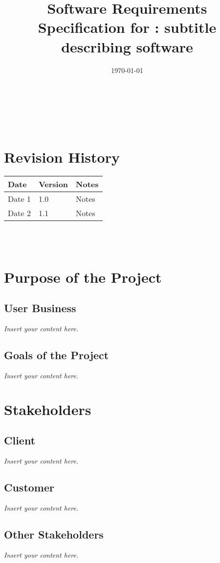 \documentclass[12pt]{article}
\newcommand{\lips}{\textit{Insert your content here.}}
\begin{document}
\title{Software Requirements Specification for \progname: subtitle describing software} 
\author{\authname}
\date{\today}
	
\maketitle

~\newpage


\tableofcontents

~\newpage

\section*{Revision History}

\begin{tabularx}{\textwidth}{p{3cm}p{2cm}X} 
\toprule {\textbf{Date}} & {\textbf{Version}} & {\textbf{Notes}}\\
\midrule
Date 1 & 1.0 & Notes\\
Date 2 & 1.1 & Notes\\
\bottomrule
\end{tabularx}

~\\

~\newpage
\section{Purpose of the Project}
\subsection{User Business}
\lips
\subsection{Goals of the Project}
\lips
\section{Stakeholders}
\subsection{Client}
\lips
\subsection{Customer}
\lips
\subsection{Other Stakeholders}
\lips
\end{document}
